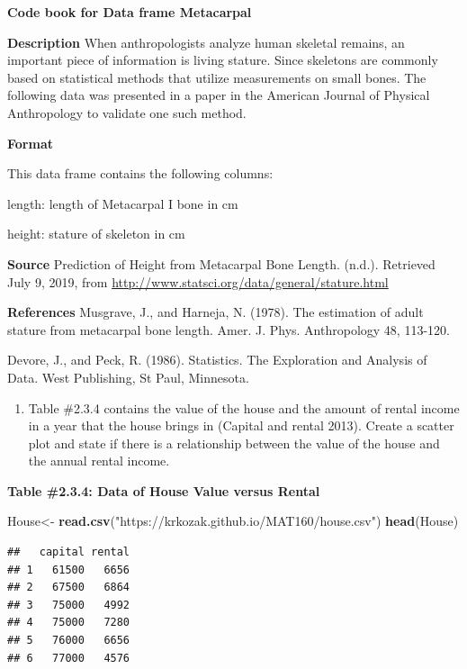 \documentclass[
]{book}
\newenvironment{Shaded}{\begin{snugshade}}{\end{snugshade}}
\newcommand{\KeywordTok}[1]{\textcolor[rgb]{0.13,0.29,0.53}{\textbf{#1}}}
\newcommand{\NormalTok}[1]{#1}
\newcommand{\StringTok}[1]{\textcolor[rgb]{0.31,0.60,0.02}{#1}}
\providecommand{\tightlist}{%
  \setlength{\itemsep}{0pt}\setlength{\parskip}{0pt}}
\begin{document}
\textbf{Code book for Data frame Metacarpal}

\textbf{Description}
When anthropologists analyze human skeletal remains, an important piece of information is living stature. Since skeletons are commonly based on statistical methods that utilize measurements on small bones. The following data was presented in a paper in the American Journal of Physical Anthropology to validate one such method.

\textbf{Format}

This data frame contains the following columns:

length: length of Metacarpal I bone in cm

height: stature of skeleton in cm

\textbf{Source}
Prediction of Height from Metacarpal Bone Length. (n.d.). Retrieved July 9, 2019, from \url{http://www.statsci.org/data/general/stature.html}

\textbf{References}
Musgrave, J., and Harneja, N. (1978). The estimation of adult stature from metacarpal bone length. Amer. J. Phys. Anthropology 48, 113-120.

Devore, J., and Peck, R. (1986). Statistics. The Exploration and Analysis of Data. West Publishing, St Paul, Minnesota.

\begin{enumerate}
\def\labelenumi{\arabic{enumi}.}
\setcounter{enumi}{1}
\tightlist
\item
  Table \#2.3.4 contains the value of the house and the amount of rental income in a year that the house brings in (Capital and rental 2013). Create a scatter plot and state if there is a relationship between the value of the house and the annual rental income.
\end{enumerate}

\textbf{Table \#2.3.4: Data of House Value versus Rental}

\begin{Shaded}
\begin{Highlighting}[]
\NormalTok{House<-}\StringTok{ }\KeywordTok{read.csv}\NormalTok{(}\StringTok{"https://krkozak.github.io/MAT160/house.csv"}\NormalTok{)}
\KeywordTok{head}\NormalTok{(House)}
\end{Highlighting}
\end{Shaded}

\begin{verbatim}
##   capital rental
## 1   61500   6656
## 2   67500   6864
## 3   75000   4992
## 4   75000   7280
## 5   76000   6656
## 6   77000   4576
\end{verbatim}
\end{document}
